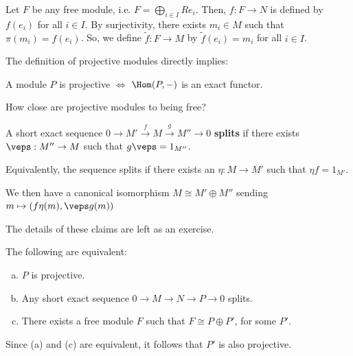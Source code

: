 \begin{ex}
    Let $F$ be any free module, i.e. $F= \bigoplus_{i \in I}Re_i$. Then, $f:F \to N$ is defined by $f(e_i)$ for all $i \in I$. By surjectivity, there exists $m_i \in M$ such that $\pi (m_i) = f(e_i)$. So, we define $\tilde f:F \to M$ by $\tilde f(e_i) = m_i$ for all $i \in I$.
\end{ex}

The definition of projective modules directly implies:

\begin{prop}
    A module $P$ is projective $\iff$ $\Hom(P,-)$ is an exact functor.
\end{prop}

\begin{notebox*}[Question]
    How close are projective modules to being free?
\end{notebox*}

\begin{defn}
    A short exact sequence $0 \to M' \overset{f}{\to} M \overset{g}{\to} M'' \to 0$ \textbf{splits} if there exists $\veps : M'' \to M$ such that $g\veps =1_{M''}$.

    Equivalently, the sequence splits if there exists an $\eta :M \to M'$ such that $\eta f = 1_{M'}$.

    We then have a canonical isomorphism $M \cong M' \oplus M''$ sending $m \mapsto (f\eta(m),\veps g (m))$
\end{defn}

The details of these claims are left as an exercise.

\begin{thm}
    The following are equivalent:
    \begin{enumerate}[(a)]
        \item  $P$ is projective.
        \item Any short exact sequence $0 \to M \to N \to P \to 0$ splits.
        \item There exists a free module $F$ such that $F \cong P \oplus P'$, for some $P'$.
    \end{enumerate}
    Since (a) and (c) are equivalent, it follows that $P'$ is also projective.
\end{thm}

